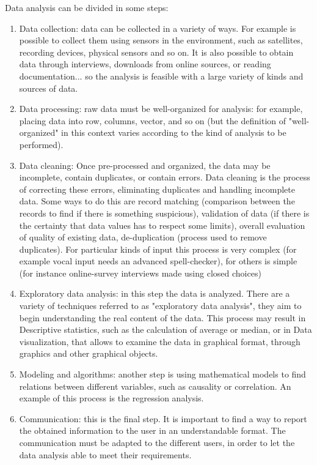 Data analysis can be divided in some steps:

\begin{enumerate}

\item Data collection: data can be collected in a variety of ways. For example is possible to collect them using sensors in the environment, such as satellites, recording devices, physical sensors and so on. It is also possible to obtain data through interviews, downloads from online sources, or reading documentation... so the analysis is feasible with a large variety of kinds and sources of data. 

\item Data processing: raw data must be well-organized for analysis: for example, placing data into row, columns, vector, and so on (but the definition of "well-organized" in this context varies according to the kind of analysis to be performed).

\item Data cleaning: Once pre-processed and organized, the data may be incomplete, contain duplicates, or contain errors. Data cleaning is the process of correcting these errors, eliminating duplicates and handling incomplete data. Some ways to do this are record matching (comparison between the records to find if there is something suspicious), validation of data (if there is the certainty that data values has to respect some limits), overall evaluation of quality of existing data, de-duplication (process used to remove duplicates). For particular kinds of input this process is very complex (for example vocal input needs an advanced spell-checker), for others is simple (for instance online-survey interviews made using closed choices) 

\item Exploratory data analysis: in this step the data is analyzed. There are a variety of techniques referred to as "exploratory data analysis", they aim to begin understanding the real content of the data. This process may result in Descriptive statistics, such as the calculation of average or median, or in Data visualization, that allows to examine the data in graphical format, through graphics and other graphical objects.

\item Modeling and algorithms: another step is using mathematical models to find relations between different variables, such as causality or correlation. An example of this process is the regression analysis.

\item Communication: this is the final step. It is important to find a way to report the obtained information to the user in an understandable format. The communication must be adapted to the different users, in order to let the data analysis able to meet their requirements.

\end{enumerate}
